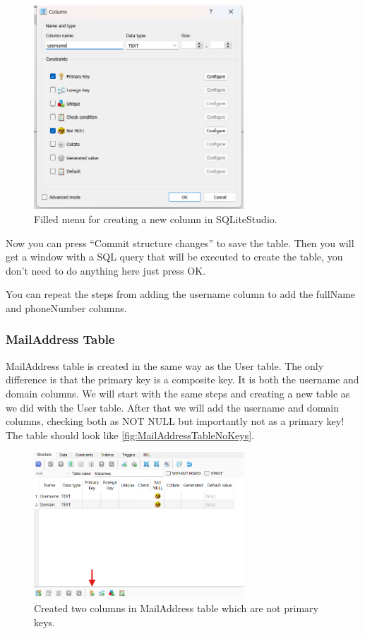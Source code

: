 \documentclass[a4paper,11pt,oneside]{article}
\begin{document}
\begin{sloppypar}
\begin{figure}[!htb]
  \centering
  \includegraphics[width=0.7\textwidth]{sqlitestudio/create_user/create_user_column_populated.png}
  \caption{Filled menu for creating a new column in SQLiteStudio.}
  \label{fig:FilledNewColumnUser}
\end{figure}
Now you can press ``Commit structure changes'' to save the table. Then you will get a window with a SQL query that will be executed to create the table, you don't need to do anything here just press OK. 

You can repeat the steps from adding the username column to add the fullName and phoneNumber columns.   

\subsubsection{MailAddress Table}
\label{sqliteStudioMailAddressTable}
MailAddress table is created in the same way as the User table. The only difference is that the primary key is a composite key. It is both the username and domain columns. We will start with the same steps and creating a new table as we did with the User table. After that we will add the username and domain columns, checking both as NOT NULL but importantly not as a primary key! The table should look like \autoref{fig:MailAddressTableNoKeys}.
\begin{figure}[!htb]
  \centering
  \includegraphics[width=0.7\textwidth]{sqlitestudio/create_mail_address/create_mail.png}
  \caption{Created two columns in MailAddress table which are not primary keys.} 
  \label{fig:MailAddressTableNoKeys}
\end{figure}


\end{sloppypar}
\end{document}
